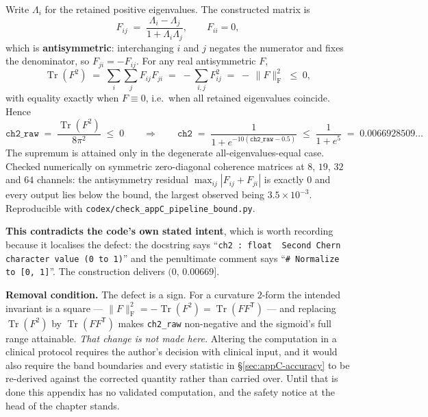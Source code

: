 Write $\Lambda_i$ for the retained positive eigenvalues. The constructed matrix
is
\begin{equation}
F_{ij} \;=\; \frac{\Lambda_i - \Lambda_j}{1 + \Lambda_i \Lambda_j},
\qquad F_{ii} = 0 ,
\end{equation}
which is \textbf{antisymmetric}: interchanging $i$ and $j$ negates the numerator
and fixes the denominator, so $F_{ji} = -F_{ij}$. For any real antisymmetric
$F$,
\begin{equation}
\operatorname{Tr}(F^2) \;=\; \sum_{i}\sum_{j} F_{ij} F_{ji}
\;=\; -\sum_{i,j} F_{ij}^{2} \;=\; -\,\lVert F \rVert_{\mathrm{F}}^{2} \;\leq\; 0 ,
\end{equation}
with equality exactly when $F \equiv 0$, i.e.\ when all retained eigenvalues
coincide. Hence
\begin{equation}
\texttt{ch2\_raw} \;=\; \frac{\operatorname{Tr}(F^2)}{8\pi^2} \;\leq\; 0
\qquad\Longrightarrow\qquad
\texttt{ch2} \;=\; \frac{1}{1 + e^{-10(\texttt{ch2\_raw} - 0.5)}}
\;\leq\; \frac{1}{1 + e^{5}} \;=\; 0.0066928509\ldots
\end{equation}
The supremum is attained only in the degenerate all-eigenvalues-equal case.
Checked numerically on symmetric zero-diagonal coherence matrices at
$8$, $19$, $32$ and $64$ channels: the antisymmetry residual
$\max_{ij}|F_{ij} + F_{ji}|$ is exactly $0$ and every output lies below the
bound, the largest observed being $3.5 \times 10^{-3}$. Reproducible with
\texttt{codex/check\_appC\_pipeline\_bound.py}.

\medskip
\noindent\textbf{This contradicts the code's own stated intent}, which is worth
recording because it localises the defect: the docstring says ``\texttt{ch2 :
float\ \ Second Chern character value (0 to 1)}'' and the penultimate comment
says ``\texttt{\# Normalize to [0, 1]}''. The construction delivers
$(0,\,0.00669]$.

\medskip
\noindent\textbf{Removal condition.} The defect is a sign. For a curvature
$2$-form the intended invariant is a square --- $\lVert F\rVert^2_{\mathrm{F}}
= -\operatorname{Tr}(F^2) = \operatorname{Tr}(F F^{\mathsf T})$ --- and
replacing $\operatorname{Tr}(F^2)$ by $\operatorname{Tr}(F F^{\mathsf T})$
makes \texttt{ch2\_raw} non-negative and the sigmoid's full range
attainable. \emph{That change is not made here.} Altering the computation in a
clinical protocol requires the author's decision with clinical input, and it
would also require the band boundaries and every statistic in
\S\ref{sec:appC-accuracy} to be re-derived against the corrected quantity
rather than carried over. Until that is done this appendix has no validated
computation, and the safety notice at the head of the chapter stands.


